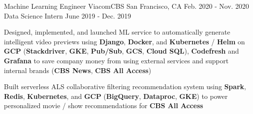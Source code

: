 \begin{cventries}
\cventryupdate
    {Machine Learning Engineer} %
    {ViacomCBS} %
    {San Francisco, CA} %
    {Feb. 2020 - Nov. 2020} %
    {Data Science Intern} %
    {June 2019 - Dec. 2019} %
    {
      \begin{cvitems} %
        \item {Designed, implemented, and launched ML service to automatically generate intelligent video previews using \textbf{Django}, \textbf{Docker}, and \textbf{Kubernetes} / \textbf{Helm} on \textbf{GCP} (\textbf{Stackdriver}, \textbf{GKE}, \textbf{Pub/Sub}, \textbf{GCS}, \textbf{Cloud SQL}), \textbf{Codefresh} and \textbf{Grafana} to save company money from using external services and support internal brands (\textbf{CBS News}, \textbf{CBS All Access})}
 		\item {Built serverless ALS collaborative filtering recommendation system using \textbf{Spark}, \textbf{Redis}, \textbf{Kubernetes}, and \textbf{GCP} (\textbf{BigQuery}, \textbf{Dataproc}, \textbf{GKE}) to power personalized movie / show recommendations for \textbf{CBS All Access}}

\end{cvitems}}
\end{cventries}
